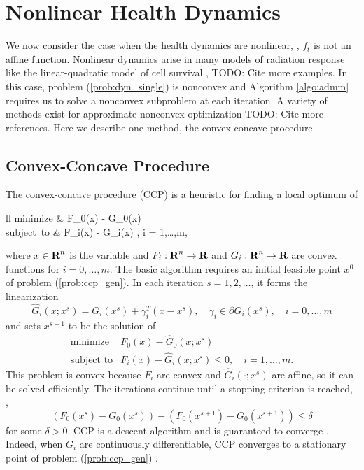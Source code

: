 \documentclass[12pt]{article}
\begin{document}
\section{Nonlinear Health Dynamics}
\label{sec:nonlin_health}
We now consider the case when the health dynamics are nonlinear, \ie, $f_t$ is not an affine function. Nonlinear dynamics arise in many models of radiation response like the linear-quadratic model of cell survival \cite{HallGiaccia:2019}, TODO: Cite more examples.
In this case, problem (\ref{prob:dyn_single}) is nonconvex and Algorithm \ref{algo:admm} requires us to solve a nonconvex subproblem at each iteration. A variety of methods exist for approximate nonconvex optimization \cite{NocedalWright:1999} TODO: Cite more references. Here we describe one method, the convex-concave procedure.

\subsection{Convex-Concave Procedure}
\label{sec:ccp}
The convex-concave procedure (CCP) \cite{YuilleRangarajan:2003,LippBoyd:2016} is a heuristic for finding a local optimum of
\BEQ
\label{prob:ccp_gen}
	\begin{array}{ll}
		\mbox{minimize} & F_0(x) - G_0(x) \\
		\mbox{subject to} & F_i(x) - G_i(x) , \quad i = 1,\ldots,m,
	\end{array}
\EEQ
where $x \in {\mbox{\bf R}}^n$ is the variable and $F_i:{\mbox{\bf R}}^n \rightarrow {\mbox{\bf R}}$ and $G_i: {\mbox{\bf R}}^n \rightarrow {\mbox{\bf R}}$ are convex functions for $i = 0,\ldots,m$. The basic algorithm requires an initial feasible point $x^0$ of problem (\ref{prob:ccp_gen}). In each iteration $s = 1,2,\ldots$, it forms the linearization
\[
	\hat G_i(x;x^s) = G_i(x^s) + \gamma_i^T(x - x^s), \quad \gamma_i \in \partial G_i(x^s), \quad i = 0,\ldots,m
\]
and sets $x^{s+1}$ to be the solution of
\[
	\begin{array}{ll}
	\mbox{minimize} & F_0(x) - \hat G_0(x;x^s) \\
	\mbox{subject to} & F_i(x) - \hat G_i(x;x^s) \leq 0, \quad i = 1,\ldots,m.
	\end{array}
\]
This problem is convex because $F_i$ are convex and $\hat G_i(\cdot;x^s)$ are affine, so it can be solved efficiently. The iterations continue until a stopping criterion is reached, \eg,
\[
	(F_0(x^s) - G_0(x^s)) - (F_0(x^{s+1}) - G_0(x^{s+1})) \leq \delta
\]
for some $\delta > 0$. CCP is a descent algorithm and is guaranteed to converge \cite[\S 1.3]{LippBoyd:2016}. Indeed, when $G_i$ are continuously differentiable, CCP converges to a stationary point of problem (\ref{prob:ccp_gen}) \cite{SriperLanck:2009}.
\end{document}
